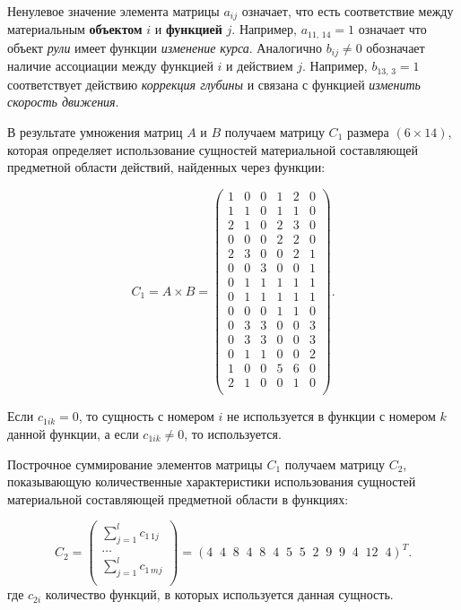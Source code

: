 Ненулевое значение элемента матрицы $a_{ij}$ означает, что есть соответствие между материальным \textbf{объектом} $i$ и \textbf{функцией} $j$.
Например, $a_{11,\,14} = 1$ означает что объект \textit{рули} имеет функции \textit{изменение курса}.
Аналогично $b_{ij} \ne 0$ обозначает наличие ассоциации между функцией $i$ и действием $j$.
Например, $b_{13,\,3} = 1$ соответствует действию \textit{коррекция глубины} и связана с функцией \textit{изменить скорость движения}.

В результате умножения матриц $A$ и $B$ получаем матрицу $C_1$ размера $(6\times14)$,
которая определяет использование сущностей материальной составляющей предметной области действий, найденных через функции:

\begin{equation}
    C_1 = A \times B = \begin{pmatrix}
        1 & 0 & 0 & 1 & 2 & 0 \\
        1 & 1 & 0 & 1 & 1 & 0 \\
        2 & 1 & 0 & 2 & 3 & 0 \\
        0 & 0 & 0 & 2 & 2 & 0 \\
        2 & 3 & 0 & 0 & 2 & 1 \\
        0 & 0 & 3 & 0 & 0 & 1 \\
        0 & 1 & 1 & 1 & 1 & 1 \\
        0 & 1 & 1 & 1 & 1 & 1 \\
        0 & 0 & 0 & 1 & 1 & 0 \\
        0 & 3 & 3 & 0 & 0 & 3 \\
        0 & 3 & 3 & 0 & 0 & 3 \\
        0 & 1 & 1 & 0 & 0 & 2 \\
        1 & 0 & 0 & 5 & 6 & 0 \\
        2 & 1 & 0 & 0 & 1 & 0 \\
    \end{pmatrix}.
\end{equation}

Если $c_{1ik} = 0$, то сущность с номером $i$ не используется в функции с номером $k$ данной функции,
а если $c_{1ik} \ne 0$, то используется.

Построчное суммирование элементов матрицы $C_1$ получаем матрицу $C_2$, показывающую количественные характеристики
использования сущностей материальной составляющей предметной области в функциях:

\begin{equation*}
    C_2 = \begin{pmatrix}
        \sum_{j=1}^l c_{1\,1j} \\
        \ldots \\
        \sum_{j=1}^l c_{1\,mj} \\
    \end{pmatrix} 
    =
    \left( 4\;\; 4\;\; 8\;\; 4\;\; 8\;\; 4\;\; 5\;\; 5\;\; 2\;\; 9\;\; 9\;\; 4\;\; 12\;\; 4 \right)^T.
\end{equation*}
где $c_{2i}$ количество функций, в которых используется данная сущность.

